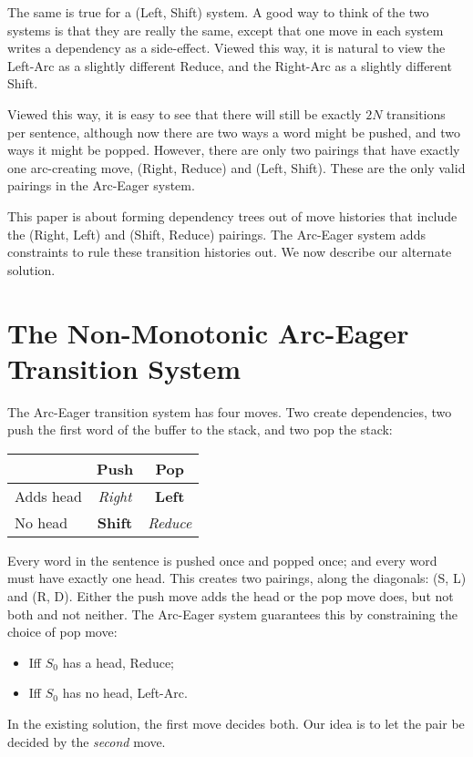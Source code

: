 \documentclass[11pt,letterpaper]{article}
\begin{document}
The same is true for a (Left, Shift) system. A good way to think of the two
systems is that they are really the same, except that one move in each system
writes a dependency as a side-effect. Viewed this way, it is natural to view the
Left-Arc as a slightly different Reduce, and the Right-Arc as a slightly different Shift.

Viewed this way, it is easy to see that there will still be exactly $2N$ transitions
per sentence, although now there are two ways a word might be pushed, and two ways
it might be popped. However, there are only two pairings that have exactly one
arc-creating move, (Right, Reduce) and (Left, Shift). These are the only valid
pairings in the Arc-Eager system.

This paper is about forming dependency trees out of move histories that include
the (Right, Left) and (Shift, Reduce) pairings. The Arc-Eager system adds
constraints to rule these transition histories out. We now describe our alternate
solution.

\section{The Non-Monotonic Arc-Eager Transition System}

The Arc-Eager transition system \citep{nivre:04} has four moves. Two create 
dependencies, two push the first word of the buffer to the stack, and two pop 
the stack:

\begin{center}
    \begin{tabular}{l|cc}
             & Push  & Pop    \\
           \hline
           Adds head   & \emph{Right} & \textbf{Left}    \\
            No head    & \textbf{Shift} & \emph{Reduce}   \\
     \end{tabular}
\end{center}

Every word in the sentence is pushed once and popped once; and every
word must have exactly one head. This creates two pairings, along the
diagonals: (S, L) and (R, D).
Either the push move adds the head or the pop move does, but not both and not neither.
The Arc-Eager system guarantees this by constraining the choice of pop move:

\begin{itemize}\setlength{\itemsep}{-2mm}
    \item Iff $S_0$ has a head, Reduce;
    \item Iff $S_0$ has no head, Left-Arc.
\end{itemize}
In the existing solution, the first move decides both.
Our idea is to let the pair be decided by the \emph{second} move.
\end{document}
